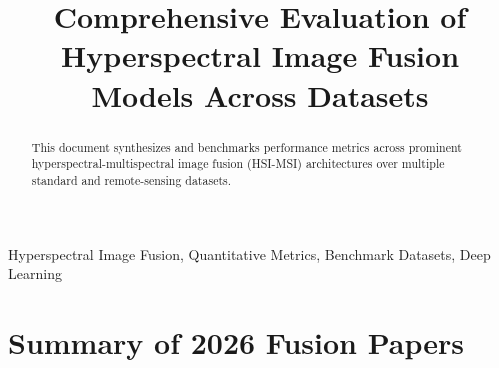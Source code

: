 \documentclass[conference]{IEEEtran}
\begin{document}
\title{Comprehensive Evaluation of Hyperspectral Image Fusion Models Across Datasets}

\author{
}

\maketitle

\begin{abstract}
This document synthesizes and benchmarks performance metrics across prominent hyperspectral-multispectral image fusion (HSI-MSI) architectures over multiple standard and remote-sensing datasets.
\end{abstract}

\begin{IEEEkeywords}
Hyperspectral Image Fusion, Quantitative Metrics, Benchmark Datasets, Deep Learning
\end{IEEEkeywords}

\section{Summary of 2026 Fusion Papers}
\end{document}
